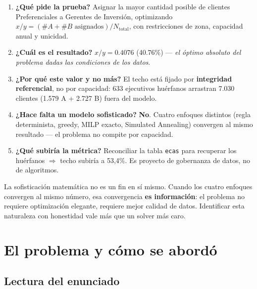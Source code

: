 \documentclass[11pt,a4paper]{article}
\begin{document}
\begin{honestybox}
\begin{enumerate}[leftmargin=*]
    \item \textbf{¿Qué pide la prueba?} Asignar la mayor cantidad posible de clientes Preferenciales a Gerentes de Inversión, optimizando $x/y = (\#A + \#B \text{ asignados}) / N_{\text{total}}$, con restricciones de zona, capacidad anual y unicidad.
    \item \textbf{¿Cuál es el resultado?} \textbf{$x/y = 0.4076$} (40.76\%) --- \emph{el óptimo absoluto del problema dadas las condiciones de los datos}.
    \item \textbf{¿Por qué este valor y no más?} El techo está fijado por \textbf{integridad referencial}, no por capacidad: 633 ejecutivos huérfanos arrastran 7.030 clientes (1.579 A + 2.727 B) fuera del modelo.
    \item \textbf{¿Hace falta un modelo sofisticado?} \textbf{No}. Cuatro enfoques distintos (regla determinista, greedy, MILP exacto, Simulated Annealing) convergen al mismo resultado --- el problema no compite por capacidad.
    \item \textbf{¿Qué subiría la métrica?} Reconciliar la tabla \texttt{ecas} para recuperar los huérfanos $\Rightarrow$ techo subiría a 53,4\%. Es proyecto de gobernanza de datos, no de algoritmos.
\end{enumerate}
\end{honestybox}

\begin{insightbox}
La sofisticación matemática no es un fin en sí mismo. Cuando los cuatro enfoques convergen al mismo número, esa convergencia \textbf{es información}: el problema no requiere optimización elegante, requiere mejor calidad de datos. Identificar esta naturaleza con honestidad vale más que un solver más caro.
\end{insightbox}

\newpage

\tableofcontents
\newpage

\section{El problema y cómo se abordó}

\subsection{Lectura del enunciado}
\end{document}
